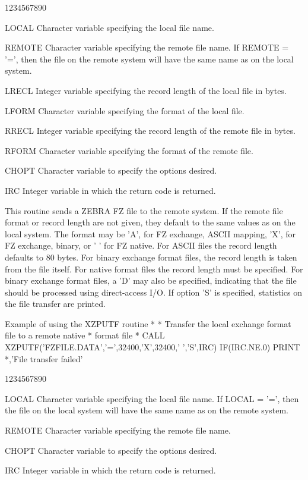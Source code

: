\begin{DLtt}{1234567890}
\item[LOCAL]Character variable specifying the local file name.
\item[REMOTE]Character variable specifying the remote file name.
If REMOTE = '=', then the file on the remote system will
have the same name as on the local system.
\item[LRECL]Integer variable specifying the record length of the local
file in bytes.
\item[LFORM]Character variable specifying the format of the local file.
\item[RRECL]Integer variable specifying the record length of the remote
file in bytes.
\item[RFORM]Character variable specifying the format of the remote file.
\item[CHOPT]Character variable to specify the options desired.
\item[IRC]Integer variable in which the return code is returned.
\end{DLtt}
\par
This routine sends a ZEBRA FZ file to the remote system.
If the remote file format or record length are not given,
they default to the same values as on the local system.
The format may be 'A', for FZ exchange, ASCII mapping,
'X', for FZ exchange, binary, or ' ' for FZ native.
For ASCII files the record length defaults to 80 bytes.
For binary exchange format files, the record length is taken
from the file itself. For native format files the record
length must be specified. For binary exchange format files,
a 'D' may also be specified, indicating that the file should
be processed using direct-access I/O.
If option 'S' is specified, statistics on the file transfer
are printed.
\begin{XMPt}{Example of using the XZPUTF routine}
*
*     Transfer the local exchange format file to a remote native
*     format file
*
      CALL XZPUTF('FZFILE.DATA','=',32400,'X',32400,' ','S',IRC)
      IF(IRC.NE.0) PRINT *,'File transfer failed'
\end{XMPt}
\begin{DLtt}{1234567890}
\item[LOCAL]Character variable specifying the local file name.
If LOCAL = '=', then the file on the local system will
have the same name as on the remote system.
\item[REMOTE]Character variable specifying the remote file name.
\item[CHOPT]Character variable to specify the options desired.
\item[IRC]Integer variable in which the return code is returned.
\end{DLtt}
